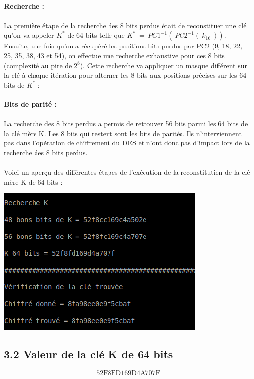 			\paragraph{Recherche :} 
			\paragraph{} La première étape de la recherche des 8 bits perdus était de reconstituer une clé qu'on va appeler $K^{*}$ de 64 bits telle que $K^{*}\ =\ PC1^{-1}(\ PC2^{-1}(\ k_{16}\ ))$.\\
			\indent Ensuite, une fois qu'on a récupéré les positions bits perdus par PC2 (9, 18, 22, 25, 35, 38, 43 et 54), on effectue une recherche exhaustive pour ces 8 bits (complexité au pire de $2^{8}$). Cette recherche va appliquer un masque différent sur la clé à chaque itération pour alterner les 8 bits aux positions précises sur les 64 bits de $K^{*}$ :
			
			
			
			\paragraph{Bits de parité :} 
			\paragraph{} La recherche des 8 bits perdus a permis de retrouver 56 bits parmi les 64 bits de la clé mère K. Les 8 bits qui restent sont les bits de parités. Ils n'interviennent pas dans l'opération de chiffrement du DES et n'ont donc pas d'impact lors de la recherche des 8 bits perdus.
			
			\paragraph{} Voici un aperçu des différentes étapes de l'exécution de la reconstitution de la clé mère K de 64 bits :
			
			\begin{center}\includegraphics[scale=1]{K.png}\end{center}
			
		\subsection*{3.2 Valeur de la clé K de 64 bits}
		\[ \textrm{52F8FD169D4A707F} \]
			

